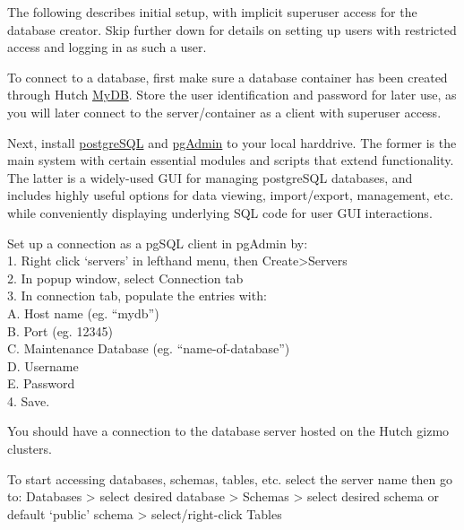 \documentclass[]{article}
\begin{document}
The following describes initial setup, with implicit superuser access
for the database creator. Skip further down for details on setting up
users with restricted access and logging in as such a user.

To connect to a database, first make sure a database container has been
created through Hutch \href{https://mydb.fredhutch.org/login}{MyDB}.
Store the user identification and password for later use, as you will
later connect to the server/container as a client with superuser access.

Next, install \href{https://www.postgresql.org/download/}{postgreSQL}
and \href{https://www.pgadmin.org/}{pgAdmin} to your local harddrive.
The former is the main system with certain essential modules and scripts
that extend functionality. The latter is a widely-used GUI for managing
postgreSQL databases, and includes highly useful options for data
viewing, import/export, management, etc. while conveniently displaying
underlying SQL code for user GUI interactions.

Set up a connection as a pgSQL client in pgAdmin by:\\
1. Right click `servers' in lefthand menu, then
Create\textgreater{}Servers\\
2. In popup window, select Connection tab\\
3. In connection tab, populate the entries with:\\
A. Host name (eg. ``mydb'')\\
B. Port (eg. 12345)\\
C. Maintenance Database (eg. ``name-of-database'')\\
D. Username\\
E. Password\\
4. Save.

You should have a connection to the database server hosted on the Hutch
gizmo clusters.

To start accessing databases, schemas, tables, etc. select the server
name then go to: Databases \textgreater{} select desired database
\textgreater{} Schemas \textgreater{} select desired schema or default
`public' schema \textgreater{} select/right-click Tables
\end{document}
